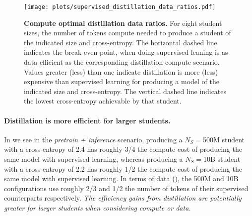 \begin{figure}[h]
	\centering
	\texttt{[image: plots/supervised\_distillation\_data\_ratios.pdf]}
	\caption{\textbf{Compute optimal distillation data ratios.} For eight student sizes, the number of tokens compute needed to produce a student of the indicated size and cross-entropy.
    The horizontal dashed line indicates the break-even point, when doing supervised leaning is as data efficient as the corresponding distillation compute scenario.
    Values greater (less) than one indicate distillation is more (less) expensive than supervised learning for producing a model of the indicated size and cross-entropy. 
    The vertical dashed line indicates the lowest cross-entropy achievable by that student.
	}
	\label{fig:compute-optimal-distillation-data-ratios-app}
\end{figure}

\paragraph{Distillation is more efficient for larger students.}
In
we see in the \emph{pretrain + inference} scenario, producing a $N_S=$500M student with a cross-entropy of 2.4
has roughly 3/4 the compute cost of producing the same model with supervised learning,
whereas producing a $N_S=$10B student with a cross-entropy of 2.2
has roughly 1/2 the compute cost of producing the same model with supervised learning.
In terms of data (),
the 500M and 10B configurations
use roughly 2/3 and 1/2 the number of tokens of their supervised counterparts respectively.
\emph{The efficiency gains from distillation are potentially greater for larger students when considering compute or data.}

